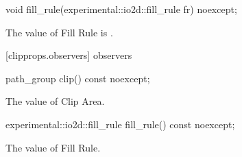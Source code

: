 \begin{itemdecl}
void fill_rule(experimental::io2d::fill_rule fr) noexcept;
\end{itemdecl}
\begin{itemdescr}
\pnum
\effects
The value of Fill Rule is .
\end{itemdescr}

 [clipprops.observers] { observers}

\begin{itemdecl}
path_group clip() const noexcept;
\end{itemdecl}
\begin{itemdescr}
\pnum
\returns
The value of Clip Area.
\end{itemdescr}

\begin{itemdecl}
experimental::io2d::fill_rule fill_rule() const noexcept;
\end{itemdecl}
\begin{itemdescr}
\pnum
\returns
The value of Fill Rule.
\end{itemdescr}
